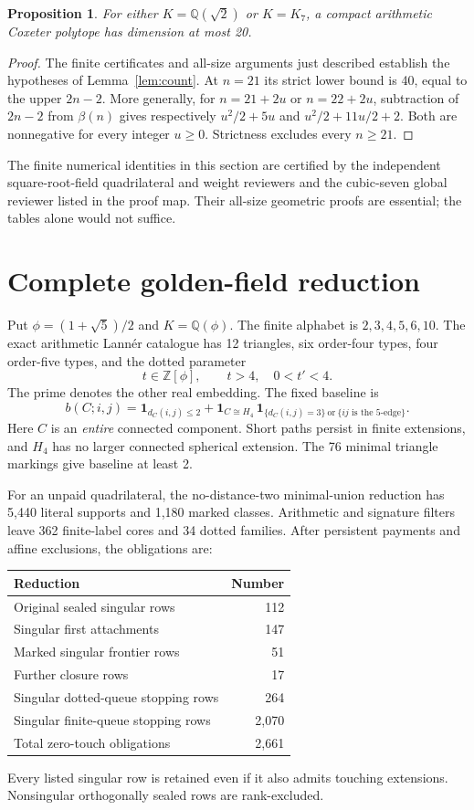 \documentclass[11pt]{article}
\newtheorem{proposition}[theorem]{Proposition}
\newcommand{\Q}{\mathbb Q}
\begin{document}
\begin{proposition}\label{prop:twofields}
For either $K=\Q(\sqrt 2)$ or $K=K_7$, a compact arithmetic Coxeter
polytope has dimension at most 20.
\end{proposition}
\begin{proof}
The finite certificates and all-size arguments just described establish
the hypotheses of Lemma~\ref{lem:count}. At $n=21$ its strict lower bound
is 40, equal to the upper $2n-2$. More generally, for $n=21+2u$ or
$n=22+2u$, subtraction of $2n-2$ from $\beta(n)$ gives respectively
$u^2/2+5u$ and $u^2/2+11u/2+2$. Both are nonnegative for every integer
$u\ge 0$. Strictness excludes every $n\ge 21$.
\end{proof}
The finite numerical identities in this section are certified by the
independent square-root-field quadrilateral and weight reviewers and the
cubic-seven global reviewer listed in the proof map. Their all-size
geometric proofs are essential; the tables alone would not suffice.

\section{Complete golden-field reduction}
Put $\phi=(1+\sqrt 5)/2$ and $K=\Q(\phi)$.
The finite alphabet is $2,3,4,5,6,10$. The exact arithmetic Lann\'er
catalogue has 12 triangles, six order-four types, four order-five types,
and the dotted parameter
\[
 t\in\mathbb Z[\phi],\qquad t>4,\quad 0<t'<4.
\]
The prime denotes the other real embedding. The fixed baseline is
\[
 b(C;i,j)=\mathbf 1_{d_C(i,j)\le 2}
 +\mathbf 1_{C\cong H_4}\,
    \mathbf 1_{\{d_C(i,j)=3\}\ \text{or}\ \{\text{$ij$ is the 5-edge}\}}.
\]
Here $C$ is an \emph{entire} connected component. Short paths persist in
finite extensions, and $H_4$ has no larger connected spherical extension.
The 76 minimal triangle markings give baseline at least 2.

For an unpaid quadrilateral, the no-distance-two minimal-union reduction
has 5,440 literal supports and 1,180 marked classes. Arithmetic and
signature filters leave 362 finite-label cores and 34 dotted families.
After persistent payments and affine exclusions, the obligations are:
\begin{center}
\begin{tabular}{lr}\toprule
Reduction&Number\\\midrule
Original sealed singular rows&112\\
Singular first attachments&147\\
Marked singular frontier rows&51\\
Further closure rows&17\\
Singular dotted-queue stopping rows&264\\
Singular finite-queue stopping rows&2,070\\\midrule
Total zero-touch obligations&2,661\\\bottomrule
\end{tabular}
\end{center}
Every listed singular row is retained even if it also admits touching
extensions. Nonsingular orthogonally sealed rows are rank-excluded.
\end{document}
